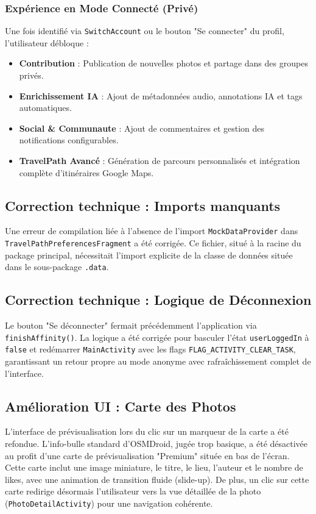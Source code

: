 \documentclass{article}
\begin{document}
\subsubsection{Expérience en Mode Connecté (Privé)}
Une fois identifié via \texttt{SwitchAccount} ou le bouton "Se connecter" du profil, l'utilisateur débloque :
\begin{itemize}
    \item \textbf{Contribution} : Publication de nouvelles photos et partage dans des groupes privés.
    \item \textbf{Enrichissement IA} : Ajout de métadonnées audio, annotations IA et tags automatiques.
    \item \textbf{Social \& Communaute} : Ajout de commentaires et gestion des notifications configurables.
    \item \textbf{TravelPath Avancé} : Génération de parcours personnalisés et intégration complète d'itinéraires Google Maps.
\end{itemize}

\subsection{Correction technique : Imports manquants}
Une erreur de compilation liée à l'absence de l'import \texttt{MockDataProvider} dans \texttt{TravelPathPreferencesFragment} a été corrigée. Ce fichier, situé à la racine du package principal, nécessitait l'import explicite de la classe de données située dans le sous-package \texttt{.data}.

\subsection{Correction technique : Logique de Déconnexion}
Le bouton "Se déconnecter" fermait précédemment l'application via \texttt{finishAffinity()}. La logique a été corrigée pour basculer l'état \texttt{userLoggedIn} à \texttt{false} et redémarrer \texttt{MainActivity} avec les flags \texttt{FLAG\_ACTIVITY\_CLEAR\_TASK}, garantissant un retour propre au mode anonyme avec rafraîchissement complet de l'interface.

\subsection{Amélioration UI : Carte des Photos}
L'interface de prévisualisation lors du clic sur un marqueur de la carte a été refondue. L'info-bulle standard d'OSMDroid, jugée trop basique, a été désactivée au profit d'une carte de prévisualisation "Premium" située en bas de l'écran. Cette carte inclut une image miniature, le titre, le lieu, l'auteur et le nombre de likes, avec une animation de transition fluide (slide-up). De plus, un clic sur cette carte redirige désormais l'utilisateur vers la vue détaillée de la photo (\texttt{PhotoDetailActivity}) pour une navigation cohérente.
\end{document}
